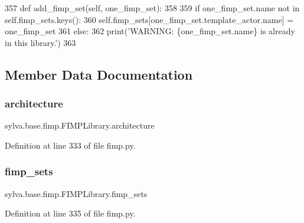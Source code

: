 \begin{DoxyCode}
357     \textcolor{keyword}{def }add\_fimp\_set(self, one\_fimp\_set):
358 
359         \textcolor{keywordflow}{if} one\_fimp\_set.name \textcolor{keywordflow}{not} \textcolor{keywordflow}{in} self.fimp\_sets.keys():
360             self.fimp\_sets[one\_fimp\_set.template\_actor.name] = one\_fimp\_set
361         \textcolor{keywordflow}{else}:
362             print(\textcolor{stringliteral}{'WARNING: \{one\_fimp\_set.name\} is already in this library.'})
363 \end{DoxyCode}


\subsection{Member Data Documentation}
\mbox{\label{classsylva_1_1base_1_1fimp_1_1_f_i_m_p_library_a1ba72f18ffa3b1e87c7e0eff1086d0ce}} 
\subsubsection{\texorpdfstring{architecture}{architecture}}
{\footnotesize\ttfamily sylva.\+base.\+fimp.\+F\+I\+M\+P\+Library.\+architecture}



Definition at line 333 of file fimp.\+py.

\mbox{\label{classsylva_1_1base_1_1fimp_1_1_f_i_m_p_library_afc2c121670a583e90dc26952815a6613}} 
\subsubsection{\texorpdfstring{fimp\+\_\+sets}{fimp\_sets}}
{\footnotesize\ttfamily sylva.\+base.\+fimp.\+F\+I\+M\+P\+Library.\+fimp\+\_\+sets}



Definition at line 335 of file fimp.\+py.




